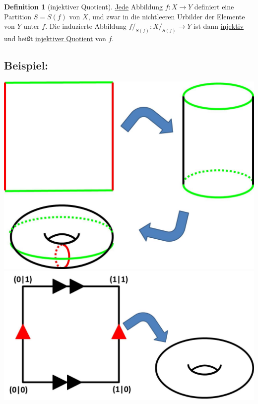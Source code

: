 \documentclass[a4paper,11pt,notitlepage]{report}
\theoremstyle{remark}
\theoremstyle{definition}
\newtheorem{definition}{Definition}[chapter]
\newenvironment{bsp}[1]
{
\setlength{\fboxsep}{10pt}
\subsection*{Beispiel: #1}
\begin{upshape}
}
{
\end{upshape}
}
\begin{document}
\begin{definition}[injektiver Quotient]
\underline{\underline{Jede}} Abbildung $f \colon X \rightarrow Y$ definiert eine Partition $S = S(f)$ von $X$, und zwar in die nichtleeren Urbilder der Elemente von $Y$ unter $f$.
\newline
Die induzierte Abbildung $f/_{S(f)} \colon X/_{S(f)} \rightarrow Y$ ist dann \underline{injektiv} und heißt \underline{injektiver Quotient} von $f$.
\end{definition}

\begin{bsp}{}
	\includegraphics[scale=0.6]{images/Quadrat_nach_Torus.jpg}
	\newline
	\includegraphics[scale=0.6]{images/Quotient_Torus.jpg}\newline

\end{bsp}
\end{document}
